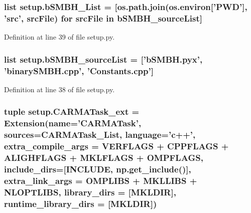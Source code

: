 \hypertarget{namespacesetup_a8e78a501073cfe941c05b388c2e7956e}{
\subsubsection[{b\-S\-M\-B\-H\-\_\-\-List}]{\setlength{\rightskip}{0pt plus 5cm}list setup.\-b\-S\-M\-B\-H\-\_\-\-List = \mbox{[}os.\-path.\-join(os.\-environ\mbox{[}'P\-W\-D'\mbox{]}, 'src', src\-File) for src\-File in {\bf b\-S\-M\-B\-H\-\_\-source\-List}\mbox{]}}}\label{namespacesetup_a8e78a501073cfe941c05b388c2e7956e}


Definition at line 39 of file setup.\-py.

\hypertarget{namespacesetup_aaae7fa8a3db10577b6550c7b841e4669}{
\subsubsection[{b\-S\-M\-B\-H\-\_\-source\-List}]{\setlength{\rightskip}{0pt plus 5cm}list setup.\-b\-S\-M\-B\-H\-\_\-source\-List = \mbox{[}'b\-S\-M\-B\-H.\-pyx', 'binary\-S\-M\-B\-H.\-cpp', 'Constants.\-cpp'\mbox{]}}}\label{namespacesetup_aaae7fa8a3db10577b6550c7b841e4669}


Definition at line 38 of file setup.\-py.

\hypertarget{namespacesetup_ab526aa988f441f3a58795affc1d3b7de}{
\subsubsection[{C\-A\-R\-M\-A\-Task\-\_\-ext}]{\setlength{\rightskip}{0pt plus 5cm}tuple setup.\-C\-A\-R\-M\-A\-Task\-\_\-ext = Extension({\bf name}='C\-A\-R\-M\-A\-Task', sources={\bf C\-A\-R\-M\-A\-Task\-\_\-\-List}, language='{\bf c}++', extra\-\_\-compile\-\_\-args = {\bf V\-E\-R\-F\-L\-A\-G\-S} + {\bf C\-P\-P\-F\-L\-A\-G\-S} + {\bf A\-L\-I\-G\-H\-F\-L\-A\-G\-S} + {\bf M\-K\-L\-F\-L\-A\-G\-S} + {\bf O\-M\-P\-F\-L\-A\-G\-S}, include\-\_\-dirs=\mbox{[}{\bf I\-N\-C\-L\-U\-D\-E}, np.\-get\-\_\-include()\mbox{]}, extra\-\_\-link\-\_\-args = {\bf O\-M\-P\-L\-I\-B\-S} + {\bf M\-K\-L\-L\-I\-B\-S} + {\bf N\-L\-O\-P\-T\-L\-I\-B\-S}, library\-\_\-dirs = \mbox{[}{\bf M\-K\-L\-D\-I\-R}\mbox{]}, runtime\-\_\-library\-\_\-dirs = \mbox{[}{\bf M\-K\-L\-D\-I\-R}\mbox{]})}}\label{namespacesetup_ab526aa988f441f3a58795affc1d3b7de}


